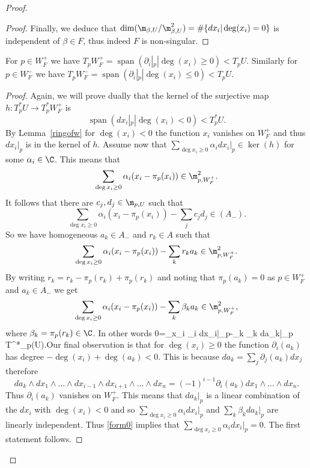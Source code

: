 \begin{proof}
\begin{proof}
		Finally, we deduce that $\dim(\m_{\beta,U}/\m^2_{\beta,U})=\#\{dx_i|\deg(x_i)=0\}$ is independent of $\beta\in F$, thus indeed $F$ is non-singular.
	\end{proof}
	\begin{lemma}
\notready \label{tangentattractor} For $p\in W^+_{F}$ we have $T_p W^+_{F}=\operatorname{span}(\partial_i|_p|\deg(x_i)\geq 0)<T_pU.$ Similarly for $p\in W^-_{F}$ we have $T_p W^-_{F}=\operatorname{span}(\partial_i|_p|\deg(x_i)\leq 0)<T_pU.$
	\end{lemma}
	\begin{proof} Again, we will prove dually that the kernel of the surjective map $h:T^*_p U\to T^*_p W^+_{F}$ is $$\operatorname{span}(dx_i|_p| \deg(x_i)< 0)<T^*_p U.$$ By Lemma~\ref{ringofw} for $\deg(x_i)<0$ the function $x_i$ vanishes on $W^+_{F}$ and thus $dx_i|_p$ is in the kernel of $h$.
		Assume now that $\sum_{\deg x_i\geq 0} \alpha_i dx_i|_p\in \ker(h)$ for some $\alpha_i\in \C$.  This means that $$\sum_{\deg x_i\geq 0} \alpha_i (x_i-\pi_p(x_i))\in \m_{p,W^+_{F}}^2.$$ It follows that there are $c_j,d_j\in \m_{p,U}$ such that $$\sum_{\deg x_i\geq 0} \alpha_i (x_i-\pi_p(x_i))-\sum_j c_j d_j\in (A_-).$$ So we have homogeneous $a_k\in A_-$ and $r_k\in A$ such that $$\sum_{\deg x_i\geq 0} \alpha_i (x_i-\pi_p(x_i))-\sum_k r_k a_k\in \m_{p,W^+_{F}}^2 .$$ By writing $r_k=r_k-\pi_p(r_k)+\pi_p(r_k)$ and noting that $\pi_p(a_k)=0$ as $p\in W^+_{F}$ and $a_k\in A_-$ we get
		$$\sum_{\deg x_i\geq 0} \alpha_i (x_i-\pi_p(x_i))-\sum_k \beta_k a_k\in \m_{p,W^+_{F}}^2 ,$$ where $\beta_k=\pi_p(r_k)\in \C$. In other words \beq \label{form0} 0=\sum_{\deg x_i} \alpha_i dx_i|_p-\sum_k \beta_k da_k|_p \in T^*_p(U).\eeq Our final observation is that for $\deg(x_i)\geq 0$ the function $\partial_i(a_k)$ has degree $-\deg(x_i)+\deg(a_k)<0$. This is because $da_k=  \sum_j \partial_j(a_k)dx_j$ therefore $$ da_k\wedge dx_1\wedge\dots \wedge dx_{i-1}\wedge d x_{i+1}\wedge \dots \wedge dx_n=(-1)^{i-1} \partial_i(a_k)dx_1\wedge \dots \wedge dx_n. $$ Thus $\partial_i(a_k)$ vanishes on $W^+_{F}$. This means that $da_k|_p$ is a linear combination of the $dx_i$ with $\deg(x_i)<0$ and so $\sum_{\deg x_i\geq 0} \alpha_i dx_i|_p$ and $\sum_k \beta_k da_k|_p$ are linearly independent. Thus \eqref{form0} implies that $\sum_{\deg x_i\geq 0} \alpha_i dx_i|_p=0$. The first statement follows.


\end{proof}
\end{proof}
